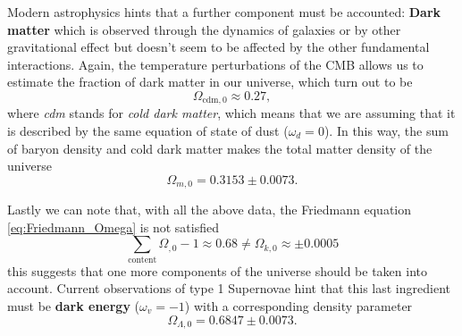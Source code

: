 Modern astrophysics hints that a further component must be accounted: \textbf{Dark matter} which is observed through the dynamics of galaxies or by other gravitational effect but doesn't seem to be affected by the other fundamental interactions. Again, the temperature perturbations of the CMB allows us to estimate the fraction of dark matter in our universe, which turn out to be $$\Omega_{\text{cdm},0} \approx0.27,$$ where \emph{cdm} stands for \emph{cold dark matter}, which means that we are assuming that it is described by the same equation of state of dust ($\omega_d=0$). In this way, the sum of baryon density and cold dark matter makes the total matter density of the universe
$$\Omega_{m,0}=0.3153\pm0.0073.$$

Lastly we can note that, with all the above data, the Friedmann equation \eqref{eq:Friedmann_Omega} is not satisfied $$\sum_{\text{content}}\Omega_{,0}-1\approx0.68\neq\Omega_{k,0}\approx\pm0.0005 $$this suggests that one more components of the universe should be taken into account. Current observations of type 1 Supernovae hint that this last ingredient must be \textbf{dark energy} ($\omega_v=-1$) with a corresponding density parameter 
$$\Omega_{\Lambda,0}=0.6847\pm0.0073.$$

